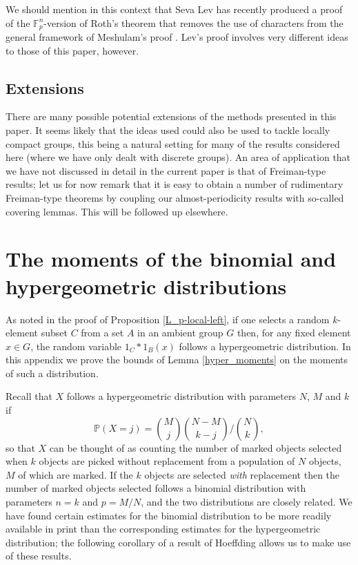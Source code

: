 \documentclass[12pt,a4paper,reqno]{amsart}
\numberwithin{equation}{section}
\theoremstyle{plain}
\theoremstyle{definition}
\def\P{\mathbb{P}}
\def\F{\mathbb{F}}
\begin{document}
We should mention in this context that Seva Lev has recently produced a proof \cite{lev:meshulam} of the $\F_p^n$-version of Roth's theorem that removes the use of characters from the general framework of Meshulam's proof \cite{meshulam}. Lev's proof involves very different ideas to those of this paper, however.

\subsection{Extensions}
There are many possible potential extensions of the methods presented in this paper. It seems likely that the ideas used could also be used to tackle locally compact groups, this being a natural setting for many of the results considered here (where we have only dealt with discrete groups). An area of application that we have not discussed in detail in the current paper is that of Freiman-type results; let us for now remark that it is easy to obtain a number of rudimentary Freiman-type theorems by coupling our almost-periodicity results with so-called covering lemmas. This will be followed up elsewhere.

\appendix
\section{The moments of the binomial and hypergeometric distributions}\label{appendix:hyper_moments}
As noted in the proof of Proposition \ref{L_p-local-left}, if one selects a random $k$-element subset $C$ from a set $A$ in an ambient group $G$ then, for any fixed element $x \in G$, the random variable $1_C*1_B(x)$ follows a hypergeometric distribution. In this appendix we prove the bounds of Lemma \ref{hyper_moments} on the moments of such a distribution.

Recall that $X$ follows a hypergeometric distribution with parameters $N$, $M$ and $k$ if
\[ \P(X = j) = \binom{M}{j}\binom{N-M}{k-j}\Big/\binom{N}{k}, \]
so that $X$ can be thought of as counting the number of marked objects selected when $k$ objects are picked without replacement from a population of $N$ objects, $M$ of which are marked. If the $k$ objects are selected \emph{with} replacement then the number of marked objects selected follows a binomial distribution with parameters $n = k$ and $p = M/N$, and the two distributions are closely related. We have found certain estimates for the binomial distribution to be more readily available in print than the corresponding estimates for the hypergeometric distribution; the following corollary of a result of Hoeffding \cite[Theorem 4]{hoeffding} allows us to make use of these results.
\end{document}
